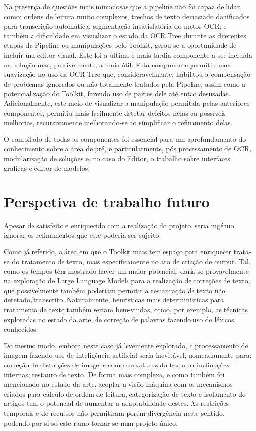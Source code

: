 Na presença de questões mais minuciosas que a pipeline não foi capaz de lidar, como: ordens de leitura muito complexos, trechos de texto demasiado danificados para transcrição automática, segmentação insatisfatória do motor OCR; e também a dificuldade em visualizar o estado da OCR Tree durante as diferentes etapas da Pipeline ou manipulações pelo Toolkit, gerou-se a oportunidade de incluir um editor visual. Este foi a última e mais tardia componente a ser incluída na solução mas, possivelmente, a mais útil. Esta componente permitiu uma suavização no uso da OCR Tree que, consideravelmente, habilitou a compensação de problemas ignorados ou não totalmente tratados pela Pipeline, assim como a potencialização do Toolkit, fazendo uso de partes dele até então desusadas. Adicionalmente, este meio de visualizar a manipulação permitida pelas anteriores componentes, permitiu mais facilmente detetar defeitos nelas ou possíveis melhorias, recursivamente melhorando-se ao simplificar o refinamento delas.

O compilado de todas as componentes foi essencial para um aprofundamento do conhecimento sobre a área de pré, e particularmente, pós processamento de OCR, modularização de soluções e, no caso do Editor, o trabalho sobre interfaces gráficas e editor de modelos.



\section{Perspetiva de trabalho futuro}

Apesar de satisfeito e enriquecido com a realização do projeto, seria ingénuo ignorar os refinamentos que este poderia ser sujeito. 

Como já referido, a área em que o Toolkit mais tem espaço para enriquecer trata-se do tratamento de texto, mais especificamente no ato de criação de output. Tal, como os tempos têm mostrado haver um maior potencial, daria-se provavelmente na exploração de Large Language Models para a realização de correções de texto, que possivelmente também poderiam permitir a restauração de texto não detetado/transcrito. Naturalmente, heurísticas mais determinísticas para tratamento de texto também seriam bem-vindas, como, por exemplo, as técnicas exploradas no estado da arte, de correção de palavras fazendo uso de léxicos conhecidos.

Do mesmo modo, embora neste caso já levemente explorado, o processamento de imagem fazendo uso de inteligência artificial seria inevitável, nomeadamente para: correção de distorções de imagens como curvaturas do texto ou inclinações internas; restauro de texto. De forma mais complexa, e como também foi mencionado no estado da arte, acoplar a visão máquina com os mecanismos criados para cálculo de ordem de leitura, categorização de texto e isolamento de artigos tem o potencial de aumentar a adaptabilidade destes. As restrições temporais e de recursos não permitiram porém divergência neste sentido, podendo por si só este ramo tornar-se num projeto único.

